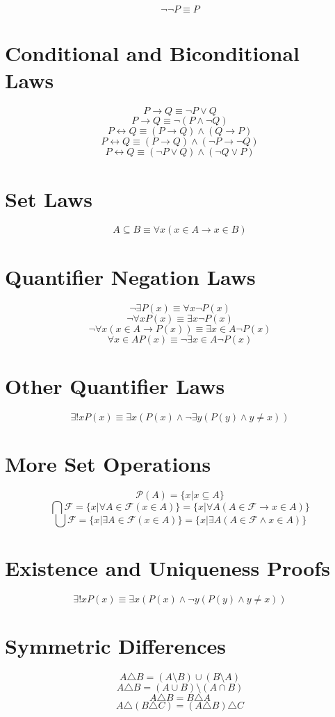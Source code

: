 \documentclass[11pt]{article}
\newcommand{\then}{\rightarrow}
\newcommand{\bicond}{\leftrightarrow}
\newcommand{\powerset}[1]{\mathscr{P}(#1)}
\newcommand{\family}{\mathcal{F}}
\begin{document}
$$\neg \neg P \equiv P$$

\section{Conditional and Biconditional Laws}

$$P \then Q \equiv \neg P \vee Q$$
$$P \then Q \equiv \neg (P \wedge \neg Q)$$
$$P \bicond Q \equiv (P \then Q) \wedge (Q \then P)$$
$$P \bicond Q \equiv (P \then Q) \wedge (\neg P \then \neg Q)$$
$$P \bicond Q \equiv (\neg P \vee Q) \wedge (\neg Q \vee P)$$

\section{Set Laws}
$$A \subseteq B \equiv \forall x (x \in A \then x \in B)$$

\section{Quantifier Negation Laws}

$$\neg \exists P(x) \equiv \forall x \neg P(x)$$
$$\neg \forall x P(x) \equiv \exists x \neg P(x)$$
$$\neg \forall x (x \in A \then P(x)) \equiv \exists x \in A \neg P(x)$$
$$\forall x \in A P(x) \equiv \neg \exists x \in A \neg P(x)$$

\section{Other Quantifier Laws}

$$\exists! x P(x) \equiv \exists x (P(x) \wedge \neg \exists y (P(y) \wedge y \neq x))$$

\section{More Set Operations}

$$\powerset{A} = \{x | x \subseteq A\}$$
$$\bigcap \family = \{x | \forall A \in \family (x \in A)\} = \{x | \forall A (A \in \family \then x \in A)\}$$
$$\bigcup \family = \{x | \exists A \in \family (x \in A)\} = \{x | \exists A (A \in \family \wedge x \in A)\}$$


\section{Existence and Uniqueness Proofs}

$$\exists! x P(x) \equiv \exists x (P(x) \wedge \neg y (P(y) \wedge y \neq x))$$

\section{Symmetric Differences}

$$A \triangle B = (A \setminus B) \cup (B \setminus A)$$
$$A \triangle B = (A \cup B) \setminus (A \cap B)$$
$$A \triangle B = B \triangle A$$
$$A \triangle (B \triangle C) = (A \triangle B) \triangle C$$
\end{document}
